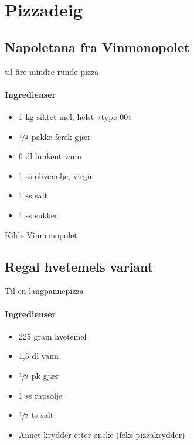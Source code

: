 \section{﻿Pizzadeig}

\subsection{Napoletana fra Vinmonopolet}
til fire mindre runde pizza
\paragraph{Ingredienser}
\begin{itemize}[noitemsep]
	\item 1 kg siktet mel, helst «type 00»
	\item $\sfrac{1}{4}$  pakke fersk gjær
	\item 6 dl lunkent vann
	\item 1 ss olivenolje, virgin
	\item 1 ss salt
	\item 1 ss sukker
\end{itemize}


Kilde \href{http://www.vinmonopolet.no/artikkel/mat-og-drikke/kombinasjoner-med-mat/pizza/drikke-til-pizza}{Vinmonopolet}


\subsection{Regal hvetemels variant}
Til en langpannepizza

\paragraph{Ingredienser}
\begin{itemize}[noitemsep]
	\item 225 gram hvetemel
	\item 1,5 dl vann
	\item $\sfrac{1}{2}$ pk gjær
	\item 1 ss rapsolje
	\item $\sfrac{1}{2}$ ts salt
	\item Annet krydder etter ønske (feks pizzakrydder)
\end{itemize}

